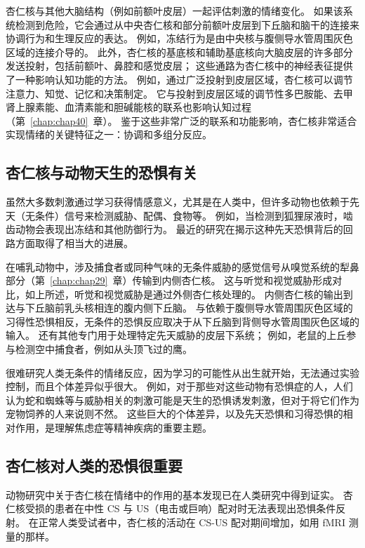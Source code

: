杏仁核与其他大脑结构（例如前额叶皮层）一起评估刺激的情绪变化。
如果该系统检测到危险，它会通过从中央杏仁核和部分前额叶皮层到下丘脑和脑干的连接来协调行为和生理反应的表达。
例如，冻结行为是由中央核与腹侧导水管周围灰色区域的连接介导的。
此外，杏仁核的基底核和辅助基底核向大脑皮层的许多部分发送投射，包括前额叶、鼻腔和感觉皮层；
这些通路为杏仁核中的神经表征提供了一种影响认知功能的方法。
例如，通过广泛投射到皮层区域，杏仁核可以调节注意力、知觉、记忆和决策制定。
它与投射到皮层区域的调节性多巴胺能、去甲肾上腺素能、血清素能和胆碱能核的联系也影响认知过程（第~\ref{chap:chap40}~章）。
鉴于这些非常广泛的联系和功能影响，杏仁核非常适合实现情绪的关键特征之一：协调和多组分反应。



\subsection{杏仁核与动物天生的恐惧有关}

虽然大多数刺激通过学习获得情感意义，尤其是在人类中，但许多动物也依赖于先天（无条件）信号来检测威胁、配偶、食物等。
例如，当检测到狐狸尿液时，啮齿动物会表现出冻结和其他防御行为。
最近的研究在揭示这种先天恐惧背后的回路方面取得了相当大的进展。


在哺乳动物中，涉及捕食者或同种气味的无条件威胁的感觉信号从嗅觉系统的犁鼻部分（第~\ref{chap:chap29}~章）传输到内侧杏仁核。
这与听觉和视觉威胁形成对比，如上所述，听觉和视觉威胁是通过外侧杏仁核处理的。
内侧杏仁核的输出到达与下丘脑前乳头核相连的腹内侧下丘脑。
与依赖于腹侧导水管周围灰色区域的习得性恐惧相反，无条件的恐惧反应取决于从下丘脑到背侧导水管周围灰色区域的输入。
还有其他专门用于处理特定先天威胁的皮层下系统；
例如，老鼠的上丘参与检测空中捕食者，例如从头顶飞过的鹰。


很难研究人类无条件的情绪反应，因为学习的可能性从出生就开始，无法通过实验控制，而且个体差异似乎很大。
例如，对于那些对这些动物有恐惧症的人，人们认为蛇和蜘蛛等与威胁相关的刺激可能是天生的恐惧诱发刺激，但对于将它们作为宠物饲养的人来说则不然。
这些巨大的个体差异，以及先天恐惧和习得恐惧的相对作用，是理解焦虑症等精神疾病的重要主题。



\subsection{杏仁核对人类的恐惧很重要}

动物研究中关于杏仁核在情绪中的作用的基本发现已在人类研究中得到证实。
杏仁核受损的患者在中性 CS 与 US（电击或巨响）配对时无法表现出恐惧条件反射。
在正常人类受试者中，杏仁核的活动在 CS-US 配对期间增加，如用 fMRI 测量的那样。


